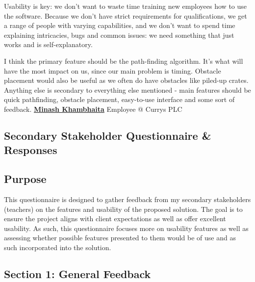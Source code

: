 Usability is key: we don't want to waste time training new employees how to use the software. Because we don't have strict requirements for qualifications, we get a range of people with varying capabilities, and we don't want to spend time explaining intricacies, bugs and common issues: we need something that just works and is self-explanatory.\newline

I think the primary feature should be the path-finding algorithm. It's what will have the most impact on us, since our main problem is timing. Obstacle placement would also be useful as we often do have obstacles like piled-up crates. Anything else is secondary to everything else mentioned - main features should be quick pathfinding, obstacle placement, easy-to-use interface and some sort of feedback.
\vspace{2cm}
\newline
\textbf{\underline{Minash Khambhaita}} \newline
Employee @ Currys PLC

\newpage
\subsection{Secondary Stakeholder Questionnaire \& Responses}

\subsection*{Purpose}
This questionnaire is designed to gather feedback from my secondary stakeholders (teachers) on the features and usability of the proposed solution. The goal is to ensure the project aligns with client expectations as well as offer excellent usability. As such, this questionnaire focuses more on usability features as well as assessing whether possible features presented to them would be of use and as such incorporated into the solution.

\subsection*{Section 1: General Feedback}

